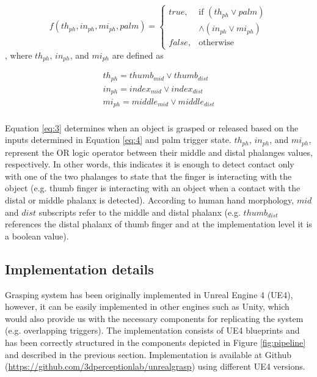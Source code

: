 \begin{itemize}
	\begin{equation} \label{eq:3}
	f(th_{ph}, in_{ph}, mi_{ph}, palm)= 
	\begin{cases}
	true, & \text{if } (th_{ph} \lor palm) \\
	& \land (in_{ph} \lor mi_{ph})\\
	false,              & \text{otherwise}
	\end{cases}
	\end{equation}, where $th_{ph}$, $in_{ph}$, and $mi_{ph}$ are defined as
	
	\begin{equation} \label{eq:4}
	\begin{array}{l}
	th_{ph} = thumb_{mid} \lor thumb_{dist} \\
	in_{ph} = index_{mid} \lor index_{dist} \\
	mi_{ph} = middle_{mid} \lor middle_{dist} \\
	\end{array}
	\end{equation}
	
	Equation \ref{eq:3} determines when an object is grasped or released based on the inputs determined in Equation \ref{eq:4} and palm trigger state. $th_{ph}$, $in_{ph}$, and $mi_{ph}$, represent the OR logic operator between their middle and distal phalanges values, respectively. In other words, this indicates it is enough to detect contact only with one of the two phalanges to state that the finger is interacting with the object (e.g. thumb finger is interacting with an object when a contact with the distal or middle phalanx is detected). According to human hand morphology, $mid$ and $dist$ subscripts refer to the middle and distal phalanx (e.g. $thumb_{dist}$ references the distal phalanx of thumb finger and at the implementation level it is a boolean value).
\end{itemize}


\subsection{Implementation details}

Grasping system has been originally implemented in Unreal Engine 4 (UE4), however, it can be easily implemented in other engines such as Unity, which would also provide us with the necessary components for replicating the system (e.g. overlapping triggers). The implementation consists of UE4 blueprints and has been correctly structured in the components depicted in Figure \ref{fig:pipeline} and described in the previous section. Implementation is available at Github (\url{https://github.com/3dperceptionlab/unrealgrasp}) using different UE4 versions.


